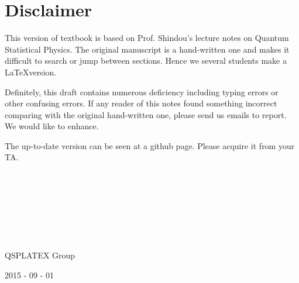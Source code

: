 ﻿\chapter*{Disclaimer}

This version of textbook is based on Prof. Shindou's lecture notes on Quantum Statistical Physics. The original manuscript is a hand-written one and makes it difficult to search or jump between sections. Hence we several students make a \LaTeX version. 

Definitely, this draft contains numerous deficiency including typing errors or other confusing errors. If any reader of this notes found something incorrect comparing with the original hand-written one, please send us emails to report. We would like to enhance. 

The up-to-date version can be seen at a github page. Please acquire it from your TA. 

\ 

\ 

\ 

\ 

QSPLATEX Group

2015 - 09 - 01

